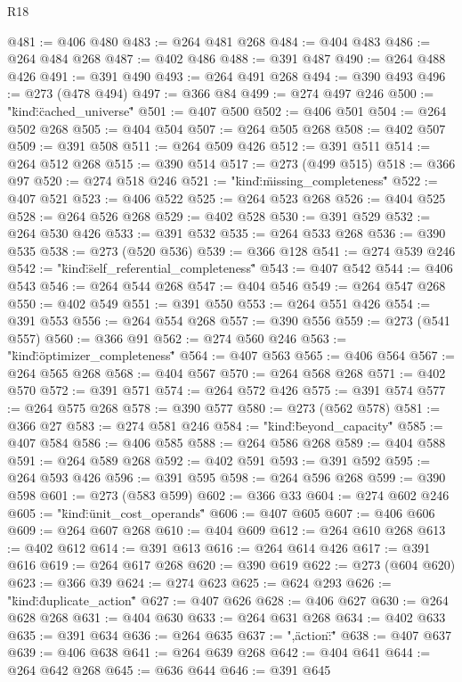 \begin{lexlean}{R18}
\begin{coremodule}
{{{{{{{{{{{{{{{{{{{{{{{{{{{{{{{{{{{{{{{{{{{{{{{{{{{{{{{{{{{{{{{{{{{{{{{{{{{{{{{{{{{{{{{{{{{{{{{{{{{{{{{{{{{{{{{{{{{{{{{{{{{{{{{@481 := @406 @480
@483 := @264 @481 @268
@484 := @404 @483
@486 := @264 @484 @268
@487 := @402 @486
@488 := @391 @487
@490 := @264 @488 @426
@491 := @391 @490
@493 := @264 @491 @268
@494 := @390 @493
@496 := @273 (@478 @494)
@497 := @366 @84
@499 := @274 @497 @246
@500 := "{\"kind\":\"cached_universe\""
@501 := @407 @500
@502 := @406 @501
@504 := @264 @502 @268
@505 := @404 @504
@507 := @264 @505 @268
@508 := @402 @507
@509 := @391 @508
@511 := @264 @509 @426
@512 := @391 @511
@514 := @264 @512 @268
@515 := @390 @514
@517 := @273 (@499 @515)
@518 := @366 @97
@520 := @274 @518 @246
@521 := "{\"kind\":\"missing_completeness\""
@522 := @407 @521
@523 := @406 @522
@525 := @264 @523 @268
@526 := @404 @525
@528 := @264 @526 @268
@529 := @402 @528
@530 := @391 @529
@532 := @264 @530 @426
@533 := @391 @532
@535 := @264 @533 @268
@536 := @390 @535
@538 := @273 (@520 @536)
@539 := @366 @128
@541 := @274 @539 @246
@542 := "{\"kind\":\"self_referential_completeness\""
@543 := @407 @542
@544 := @406 @543
@546 := @264 @544 @268
@547 := @404 @546
@549 := @264 @547 @268
@550 := @402 @549
@551 := @391 @550
@553 := @264 @551 @426
@554 := @391 @553
@556 := @264 @554 @268
@557 := @390 @556
@559 := @273 (@541 @557)
@560 := @366 @91
@562 := @274 @560 @246
@563 := "{\"kind\":\"optimizer_completeness\""
@564 := @407 @563
@565 := @406 @564
@567 := @264 @565 @268
@568 := @404 @567
@570 := @264 @568 @268
@571 := @402 @570
@572 := @391 @571
@574 := @264 @572 @426
@575 := @391 @574
@577 := @264 @575 @268
@578 := @390 @577
@580 := @273 (@562 @578)
@581 := @366 @27
@583 := @274 @581 @246
@584 := "{\"kind\":\"beyond_capacity\""
@585 := @407 @584
@586 := @406 @585
@588 := @264 @586 @268
@589 := @404 @588
@591 := @264 @589 @268
@592 := @402 @591
@593 := @391 @592
@595 := @264 @593 @426
@596 := @391 @595
@598 := @264 @596 @268
@599 := @390 @598
@601 := @273 (@583 @599)
@602 := @366 @33
@604 := @274 @602 @246
@605 := "{\"kind\":\"unit_cost_operands\""
@606 := @407 @605
@607 := @406 @606
@609 := @264 @607 @268
@610 := @404 @609
@612 := @264 @610 @268
@613 := @402 @612
@614 := @391 @613
@616 := @264 @614 @426
@617 := @391 @616
@619 := @264 @617 @268
@620 := @390 @619
@622 := @273 (@604 @620)
@623 := @366 @39
@624 := @274 @623
@625 := @624 @293
@626 := "{\"kind\":\"duplicate_action\""
@627 := @407 @626
@628 := @406 @627
@630 := @264 @628 @268
@631 := @404 @630
@633 := @264 @631 @268
@634 := @402 @633
@635 := @391 @634
@636 := @264 @635
@637 := ",\"action\":\""
@638 := @407 @637
@639 := @406 @638
@641 := @264 @639 @268
@642 := @404 @641
@644 := @264 @642 @268
@645 := @636 @644
@646 := @391 @645
}}}}}}}}}}}}}}}}}}}}}}}}}}}}}}}}}}}}}}}}}}}}}}}}}}}}}}}}}}}}}}}}}}}}}}}}}}}}}}}}}}}}}}}}}}}}}}}}}}}}}}}}}}}}}}}}}}}}}}}}}}}}}}}}}}}}}}
\end{coremodule}
\end{lexlean}
